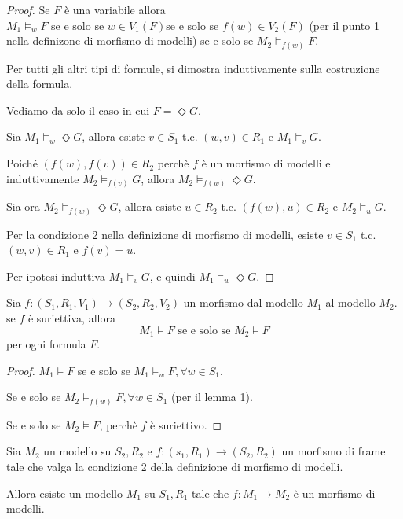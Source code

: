 \documentclass[../main.tex]{subfiles}
\begin{document}
\begin{proof}
    Se $F$ è una variabile allora $M_1 \vDash_w F \text{ se e solo se } w \in V_1(F) \text{se e solo se } f(w) \in V_2(F)$ (per il punto 1 nella definizone di morfismo di modelli) se e solo se $M_2 \vDash_{f(w)} F$.

    Per tutti gli altri tipi di formule, si dimostra induttivamente sulla costruzione della formula.

    Vediamo da solo il caso in cui $F = \Diamond G$.

    Sia $M_1 \vDash_w \Diamond G$, allora esiste $v \in S_1$ t.c. $(w,v) \in R_1$ e $M_1 \vDash_v G$.

    Poiché $(f(w),f(v)) \in R_2$ perchè $f$ è un morfismo di modelli e induttivamente $M_2 \vDash_{f(v)} G$, allora $M_2 \vDash_{f(w)} \Diamond G$.

    Sia ora $M_2 \vDash_{f(w)} \Diamond G$, allora esiste $u \in R_2$ t.c. $(f(w),u) \in R_2$ e $M_2 \vDash_u G$.

    Per la condizione 2 nella definizione di morfismo di modelli, esiste $v \in S_1$ t.c. $(w,v) \in R_1$ e $f(v) = u$.

    Per ipotesi induttiva $M_1 \vDash_v G$, e quindi $M_1 \vDash_w \Diamond G$.
\end{proof}
\begin{lemma}[Lemma 2]
    Sia $f: (S_1,R_1,V_1) \rightarrow (S_2,R_2,V_2)$ un morfismo dal modello $M_1$ al modello $M_2$. se $f$ è suriettiva, allora
    \begin{equation*}
        M_1 \vDash F \text{ se e solo se } M_2 \vDash F
    \end{equation*}
    per ogni formula $F$.
\end{lemma}
\begin{proof}
    $M_1 \vDash F$ se e solo se $M_1 \vDash_w F, \forall w \in S_1$.

    Se e solo se $M_2 \vDash_{f(w)} F, \forall w \in S_1$ (per il lemma 1).

    Se e solo se $M_2 \vDash F$, perchè $f$ è suriettivo.
\end{proof}
\begin{lemma}[Lemma 3]
    Sia $M_2$ un modello su $S_2, R_2$ e $f: (s_1,R_1) \rightarrow (S_2, R_2)$ un morfismo di frame tale che valga la condizione 2 della definizione di morfismo di modelli.

    Allora esiste un modello $M_1$ su $S_1, R_1$ tale che $f: M_1 \rightarrow M_2$ è un morfismo di modelli.
\end{lemma}
\end{document}
